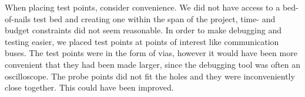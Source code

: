 When placing test points, consider convenience. We did not have access to a bed-of-nails test bed and creating one within the span of the project, time- and budget constraints did not seem reasonable. In order to make debugging and testing easier, we placed test points at points of interest like communication buses. The test points were in the form of vias, however it would have been more convenient that they had been made larger, since the debugging tool was often an oscilloscope. The probe points did not fit the holes and they were inconveniently close together. This could have been improved.